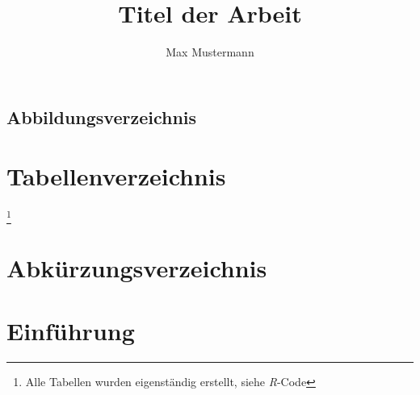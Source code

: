 \documentclass[12pt, a4paper, twoside]{article}
\title{\textbf{Titel der Arbeit}}
\author{Max Mustermann}
\newcounter{SeitenzahlSpeicher}
\begin{document}


\begin{spacing}{1}
\setcounter{page}{2}
\tableofcontents
\end{spacing}
\newpage
\begin{spacing}{1}
\section*{Abbildungsverzeichnis} 
\renewcommand{\listfigurename}{}
\listoffigures
\end{spacing}
\newpage
\section*{Tabellenverzeichnis} 
\renewcommand{\listtablename}{}
\listoftables %
\footnote{Alle Tabellen wurden eigenständig erstellt, siehe \emph{R}-Code} 
\newpage

\section*{Abkürzungsverzeichnis} 
\printacronyms[include=abbrev,name=Abkürzungen]
\newpage
\clearpage
\setcounter{SeitenzahlSpeicher}{\value{page}}
\newpage
{}

\section{Einführung}

\nocite{*}
\end{document}
